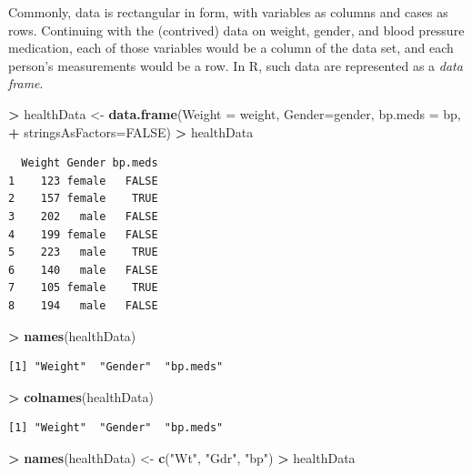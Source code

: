 \documentclass[
]{krantz}
\makeatletter
\newenvironment{Shaded}{\begin{snugshade}}{\end{snugshade}}
\newcommand{\DataTypeTok}[1]{\textcolor[rgb]{0.27,0.27,0.27}{#1}}
\newcommand{\KeywordTok}[1]{\textcolor[rgb]{0.27,0.27,0.27}{\textbf{#1}}}
\newcommand{\NormalTok}[1]{#1}
\newcommand{\OperatorTok}[1]{\textcolor[rgb]{0.43,0.43,0.43}{\textbf{#1}}}
\newcommand{\OtherTok}[1]{\textcolor[rgb]{0.37,0.37,0.37}{#1}}
\newcommand{\StringTok}[1]{\textcolor[rgb]{0.5,0.5,0.5}{#1}}
\newenvironment{kframe}{%
\medskip{}
\setlength{\fboxsep}{.8em}
 \def\at@end@of@kframe{}%
 \ifinner\ifhmode%
  \def\at@end@of@kframe{\end{minipage}}%
  \begin{minipage}{\columnwidth}%
 \fi\fi%
 \def\FrameCommand##1{\hskip\@totalleftmargin \hskip-\fboxsep
 \colorbox{shadecolor}{##1}\hskip-\fboxsep
     \hskip-\linewidth \hskip-\@totalleftmargin \hskip\columnwidth}%
 \MakeFramed {\advance\hsize-\width
   \@totalleftmargin\z@ \linewidth\hsize
   \@setminipage}}%
 {\par\unskip\endMakeFramed%
 \at@end@of@kframe}
\renewenvironment{Shaded}{\begin{kframe}}{\end{kframe}}
\makeatother
\begin{document}
Commonly, data is rectangular in form, with variables as columns and cases as rows. Continuing with the (contrived) data on weight, gender, and blood pressure medication, each of those variables would be a column of the data set, and each person's measurements would be a row. In R, such data are represented as a \emph{data frame}.

\begin{Shaded}
\begin{Highlighting}[]
\OperatorTok{\textgreater{}}\StringTok{ }\NormalTok{healthData \textless{}{-}}\StringTok{ }\KeywordTok{data.frame}\NormalTok{(}\DataTypeTok{Weight =}\NormalTok{ weight, }\DataTypeTok{Gender=}\NormalTok{gender, }\DataTypeTok{bp.meds =}\NormalTok{ bp,}
\OperatorTok{+}\StringTok{                          }\DataTypeTok{stringsAsFactors=}\OtherTok{FALSE}\NormalTok{)}
\OperatorTok{\textgreater{}}\StringTok{ }\NormalTok{healthData}
\end{Highlighting}
\end{Shaded}

\begin{verbatim}
  Weight Gender bp.meds
1    123 female   FALSE
2    157 female    TRUE
3    202   male   FALSE
4    199 female   FALSE
5    223   male    TRUE
6    140   male   FALSE
7    105 female    TRUE
8    194   male   FALSE
\end{verbatim}

\begin{Shaded}
\begin{Highlighting}[]
\OperatorTok{\textgreater{}}\StringTok{ }\KeywordTok{names}\NormalTok{(healthData)}
\end{Highlighting}
\end{Shaded}

\begin{verbatim}
[1] "Weight"  "Gender"  "bp.meds"
\end{verbatim}

\begin{Shaded}
\begin{Highlighting}[]
\OperatorTok{\textgreater{}}\StringTok{ }\KeywordTok{colnames}\NormalTok{(healthData)}
\end{Highlighting}
\end{Shaded}

\begin{verbatim}
[1] "Weight"  "Gender"  "bp.meds"
\end{verbatim}

\begin{Shaded}
\begin{Highlighting}[]
\OperatorTok{\textgreater{}}\StringTok{ }\KeywordTok{names}\NormalTok{(healthData) \textless{}{-}}\StringTok{ }\KeywordTok{c}\NormalTok{(}\StringTok{"Wt"}\NormalTok{, }\StringTok{"Gdr"}\NormalTok{, }\StringTok{"bp"}\NormalTok{)}
\OperatorTok{\textgreater{}}\StringTok{ }\NormalTok{healthData}
\end{Highlighting}
\end{Shaded}
\end{document}
